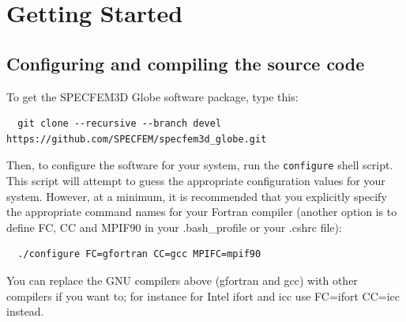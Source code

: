 
\chapter{Getting Started}\label{cha:Getting-Started}



\section{Configuring and compiling the source code}

To get the SPECFEM3D Globe software package, type this:
{\small
\begin{verbatim}
  git clone --recursive --branch devel https://github.com/SPECFEM/specfem3d_globe.git
\end{verbatim}
}
\noindent
Then, to configure the software for your system, run the
\texttt{configure} shell script. This script will attempt to guess
the appropriate configuration values for your system. However, at
a minimum, it is recommended that you explicitly specify the appropriate
command names for your Fortran compiler (another option is to define FC, CC and MPIF90 in your .bash\_profile
or your .cshrc file):
{\small
\begin{verbatim}
  ./configure FC=gfortran CC=gcc MPIFC=mpif90
\end{verbatim}
}
\noindent
You can replace the GNU compilers above (gfortran and gcc) with other compilers if you want to; for instance for Intel ifort and icc use FC=ifort CC=icc instead.\newline

